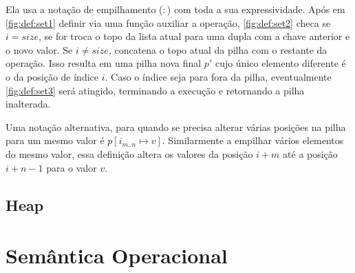 Ela usa a notação de empilhamento ($:$) com toda a sua expressividade. Após em \ref{fig:def:set1} definir via uma função auxiliar a operação, \ref{fig:def:set2} checa se $i = size$, se for troca o topo da lista atual para uma dupla com a chave anterior e o novo valor. Se $i \neq size$, concatena o topo atual da pilha com o restante da operação. Isso resulta em uma pilha nova final $p'$ cujo único elemento diferente é o da posição de índice $i$. Caso o índice seja para fora da pilha, eventualmente \ref{fig:def:set3} será atingido, terminando a execução e retornando a pilha inalterada.

Uma notação alternativa, para quando se precisa alterar várias posições na pilha para um mesmo valor é $p[i_{m..n} \mapsto v]$. Similarmente a empilhar vários elementos do mesmo valor, essa definição altera os valores da posição $i + m$ até a posição $i + n - 1$ para o valor $v$.





\subsection{Heap}


\section{Semântica Operacional}

